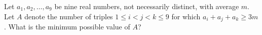 Let $a_1,a_2,\ldots,a_9$ be nine real numbers, not necessarily distinct, with average $m$. Let $A$ denote the number of triples $1 \le i < j < k \le 9$ for which $a_i + a_j + a_k \ge 3m$.  What is the minimum possible value of $A$?
